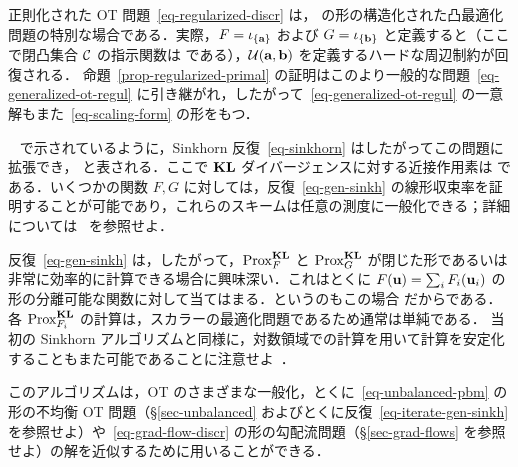 正則化された OT 問題~\eqref{eq-regularized-discr} は，
の形の構造化された凸最適化問題の特別な場合である．実際，$F=\iota_{\{\mathrm{\textbf{a}}\}}$ および $G=\iota_{\{\mathrm{\textbf{b}}\}}$ と定義すると（ここで閉凸集合 $\mathcal{C}$ の指示関数は
である），$\mathcal{U}(\mathrm{\textbf{a}},\mathrm{\textbf{b}})$ を定義するハードな周辺制約が回復される．
%
命題~\ref{prop-regularized-primal} の証明はこのより一般的な問題~\eqref{eq-generalized-ot-regul} に引き継がれ，したがって~\eqref{eq-generalized-ot-regul} の一意解もまた~\eqref{eq-scaling-form} の形をもつ．

~\citep{2015-Peyre-siims,FrognerNIPS,2016-chizat-sinkhorn,karlsson2016generalized} で示されているように，Sinkhorn 反復~\eqref{eq-sinkhorn} はしたがってこの問題に拡張でき，
と表される．ここで $\mathrm{\textbf{KL}}$ ダイバージェンスに対する近接作用素は
である．いくつかの関数 $F,G$ に対しては，反復~\eqref{eq-gen-sinkh} の線形収束率を証明することが可能であり，これらのスキームは任意の測度に一般化できる；詳細については~\citep{2016-chizat-sinkhorn} を参照せよ．

反復~\eqref{eq-gen-sinkh} は，したがって，$\operatorname{Prox}_{F}^{\mathrm{\textbf{KL}}}$ と $\operatorname{Prox}_{G}^{\mathrm{\textbf{KL}}}$ が閉じた形であるいは非常に効率的に計算できる場合に興味深い．これはとくに $F(\mathrm{\textbf{u}}) = \sum_i F_i(\mathrm{\textbf{u}}_i)$ の形の分離可能な関数に対して当てはまる．というのもこの場合
だからである．各 $\operatorname{Prox}_{F_i}^{\mathrm{\textbf{KL}}}$ の計算は，スカラーの最適化問題であるため通常は単純である．
%
当初の Sinkhorn アルゴリズムと同様に，対数領域での計算を用いて計算を安定化することもまた可能であることに注意せよ~\citep{2016-chizat-sinkhorn}．

このアルゴリズムは，OT のさまざまな一般化，とくに~\eqref{eq-unbalanced-pbm} の形の不均衡 OT 問題（\S\ref{sec-unbalanced} およびとくに反復~\eqref{eq-iterate-gen-sinkh} を参照せよ）や~\eqref{eq-grad-flow-discr} の形の勾配流問題（\S\ref{sec-grad-flows} を参照せよ）の解を近似するために用いることができる．


